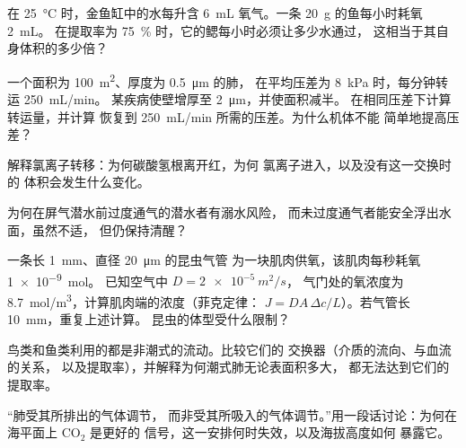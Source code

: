 \begin{exercise}[$\star\star$]\label{exo:b1:gas-exchange:6}
在 \qty{25}{\celsius} 时，金鱼缸中的水每升含
\qty{6}{mL} 氧气。一条 \qty{20}{g} 的鱼每小时耗氧 \qty{2}{mL}。
在提取率为 \qty{75}{\%} 时，它的鳃每小时必须让多少水通过，
这相当于其自身体积的多少倍？
\end{exercise}

\begin{exercise}[$\star\star$]\label{exo:b1:gas-exchange:7}
一个面积为 \qty{100}{m^2}、厚度为 \qty{0.5}{\micro m} 的肺，
在平均压差为 \qty{8}{kPa} 时，每分钟转运 \qty{250}{mL/min}。
某疾病使壁增厚至 \qty{2}{\micro m}，并使面积减半。
在相同压差下计算转运量，并计算
恢复到 \qty{250}{mL/min} 所需的压差。为什么机体不能
简单地提高压差？
\end{exercise}

\begin{exercise}[$\star\star$]\label{exo:b1:gas-exchange:8}
解释氯离子转移：为何碳酸氢根离开红，为何
氯离子进入，以及没有这一交换时的
体积会发生什么变化。
\end{exercise}

\begin{exercise}[$\star\star$]\label{exo:b1:gas-exchange:9}
为何在屏气潜水前过度通气的潜水者有溺水风险，
而未过度通气者能安全浮出水面，虽然不适，
但仍保持清醒？
\end{exercise}

\begin{exercise}[$\star\star\star$]\label{exo:b1:gas-exchange:10}
一条长 \qty{1}{mm}、直径 \qty{20}{\micro m} 的昆虫气管
为一块肌肉供氧，该肌肉每秒耗氧 \qty{1e-9}{mol}。
已知空气中 $D = \qty{2e-5}{m^2/s}$，
气门处的氧浓度为 \qty{8.7}{mol/m^3}，计算肌肉端的浓度（菲克定律：
$J = DA\,\Delta c/L$）。若气管长 \qty{10}{mm}，重复上述计算。
昆虫的体型受什么限制？
\end{exercise}

\begin{exercise}[$\star\star\star$]\label{exo:b1:gas-exchange:11}
鸟类和鱼类利用的都是非潮式的流动。比较它们的
交换器（介质的流向、与血流的关系，
以及提取率），并解释为何潮式肺无论表面积多大，
都无法达到它们的提取率。
\end{exercise}

\begin{exercise}[$\star\star\star$]\label{exo:b1:gas-exchange:12}
“肺受其所排出的气体调节，
而非受其所吸入的气体调节。”用一段话讨论：为何在海平面上 $\mathrm{CO_2}$ 是更好的
信号，这一安排何时失效，以及海拔高度如何
暴露它。
\end{exercise}

